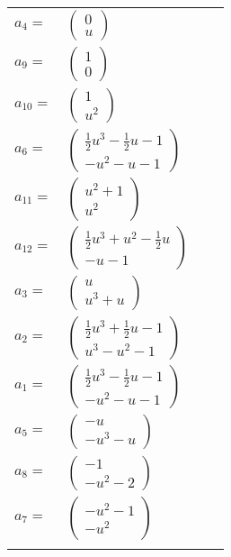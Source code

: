 \documentclass[1p]{elsarticle_modified}
\theoremstyle{definition}
\begin{document}
\begin{tabular}{m{7pt} m{180pt} m{7pt} m{180pt} }
\flushright $a_{4}=$&$\begin{pmatrix}0\\u\end{pmatrix}$ \\
\flushright $a_{9}=$&$\begin{pmatrix}1\\0\end{pmatrix}$ \\
\flushright $a_{10}=$&$\begin{pmatrix}1\\u^2\end{pmatrix}$ \\
\flushright $a_{6}=$&$\begin{pmatrix}\frac{1}{2} u^3-\frac{1}{2} u-1\\- u^2- u-1\end{pmatrix}$ \\
\flushright $a_{11}=$&$\begin{pmatrix}u^2+1\\u^2\end{pmatrix}$ \\
\flushright $a_{12}=$&$\begin{pmatrix}\frac{1}{2} u^3+u^2-\frac{1}{2} u\\- u-1\end{pmatrix}$ \\
\flushright $a_{3}=$&$\begin{pmatrix}u\\u^3+u\end{pmatrix}$ \\
\flushright $a_{2}=$&$\begin{pmatrix}\frac{1}{2} u^3+\frac{1}{2} u-1\\u^3- u^2-1\end{pmatrix}$ \\
\flushright $a_{1}=$&$\begin{pmatrix}\frac{1}{2} u^3-\frac{1}{2} u-1\\- u^2- u-1\end{pmatrix}$ \\
\flushright $a_{5}=$&$\begin{pmatrix}- u\\- u^3- u\end{pmatrix}$ \\
\flushright $a_{8}=$&$\begin{pmatrix}-1\\- u^2-2\end{pmatrix}$ \\
\flushright $a_{7}=$&$\begin{pmatrix}- u^2-1\\- u^2\end{pmatrix}$\\&\end{tabular}
\end{document}
